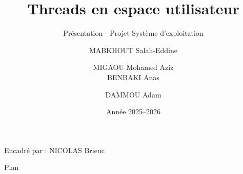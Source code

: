 \documentclass[aspectratio=169,12pt]{beamer}
\title[Threads en espace utilisateur]{Threads en espace utilisateur}
\subtitle{Présentation - Projet Système d'exploitation}
\author[Mabkhout \textperiodcentered\ Migaou \textperiodcentered\ Benbaki \textperiodcentered\ Dammou]{
  MABKHOUT Salah-Eddine \and MIGAOU Mohamed Aziz \\
  BENBAKI Anas \and DAMMOU Adam
}
\institute{ENSEIRB-MATMECA}
\date{Année 2025--2026}
\begin{document}
\begin{frame}
  \titlepage
  \begin{center}
    Encadré par : NICOLAS Brieuc
  \end{center}
\end{frame}

\begin{frame}{Plan}
  \tableofcontents
\end{frame}





\end{document}
